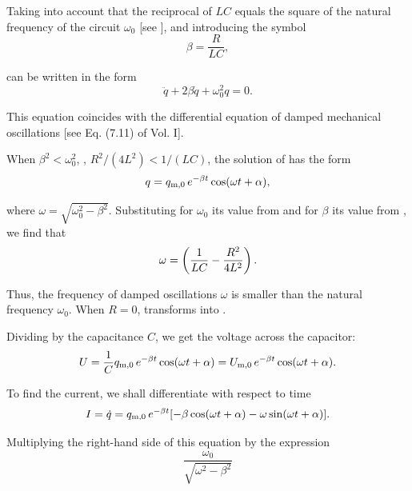 Taking into account that the reciprocal of $LC$ equals the square of the natural frequency of the circuit $\omega_0$ [see ], and introducing
the symbol
\begin{equation}\label{eq:13_12}
    \beta = \frac{R}{LC},
\end{equation}

\noindent
{} can be written in the form
\begin{equation}\label{eq:13_13}
    \ddot{q} + 2 \beta \dot{q} + \omega_0^2 q = 0.
\end{equation}

This equation coincides with the differential equation of damped mechanical oscillations [see Eq. (7.11) of Vol. I].

When $\beta^2<\omega_0^2$, \ie, $R^2/(4L^2)<1/(LC)$, the solution of  has the form
\begin{equation}\label{eq:13_14}
    q = q_{\text{m,$0$}}\, e^{-\beta t} \cos(\omega t + \alpha),
\end{equation}

\noindent
where $\omega=\sqrt{\omega_0^2-\beta^2}$.
Substituting for $\omega_0$ its value from  and for $\beta$ its value from , we find that
\begin{equation}\label{eq:13_15}
    \omega = \left( \frac{1}{LC} - \frac{R^2}{4L^2} \right).
\end{equation}

\noindent
Thus, the frequency of damped oscillations $\omega$ is smaller than the natural frequency $\omega_0$.
When $R=0$,  transforms into .

Dividing  by the capacitance $C$, we get the voltage across the capacitor:
\begin{equation}\label{eq:13_16}
    U = \frac{1}{C} q_{\text{m,$0$}}\, e^{-\beta t} \cos(\omega t + \alpha) = U_{\text{m,$0$}}\, e^{-\beta t} \cos(\omega t + \alpha).
\end{equation}

To find the current, we shall differentiate  with respect to time
\begin{equation*}
    I = \dot{q} = q_{\text{m,$0$}}\, e^{-\beta t} [-\beta \cos(\omega t + \alpha) - \omega \sin(\omega t + \alpha)].
\end{equation*}

\noindent
Multiplying the right-hand side of this equation by the expression
\begin{equation*}
    \frac{\omega_0}{\sqrt{\omega^2-\beta^2}}
\end{equation*}

